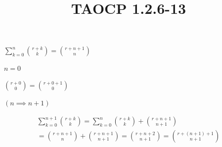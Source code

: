\documentclass{article}
\title{TAOCP 1.2.6\mbox{-}13}
\begin{document}
\maketitle

\( \sum_{k=0}^{n} \binom{r+k}{k} = \binom{r+n+1}{n} \)

\( n = 0 \)

\( \binom{r+0}{0} = \binom{r+0+1}{0} \)

\( (n \implies n + 1) \)

\begin{multline*}
\sum_{k=0}^{n+1} \binom{r+k}{k} = \sum_{k=0}^{n} \binom{r+k}{k} + \binom{r+n+1}{n+1} \\
= \binom{r+n+1}{n} + \binom{r+n+1}{n+1} = \binom{r+n+2}{n+1} = \binom{r+(n+1)+1}{n+1}
\end{multline*}
\end{document}
